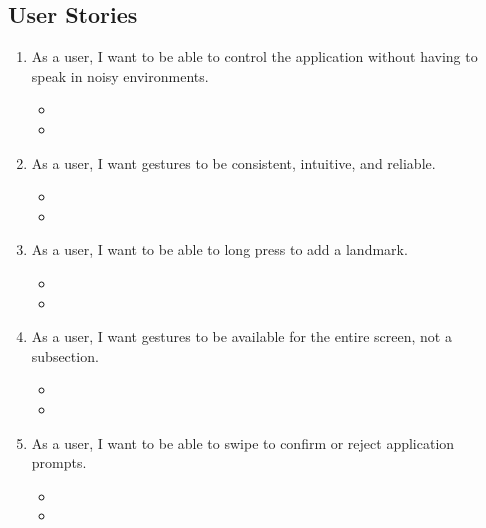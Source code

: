 \documentclass{scrreprt}
\begin{document}
\subsection{User Stories}
\begin{enumerate}
	\item As a user, I want to be able to control the application without having to speak in noisy environments.
	
		\begin{itemize}
			\item 
			\item 
		\end{itemize}
		
	\item As a user, I want gestures to be consistent, intuitive, and reliable.
	
		\begin{itemize}
			\item 
			\item 
		\end{itemize}
		
	\item As a user, I want to be able to long press to add a landmark.

		\begin{itemize}
			\item 
			\item 
		\end{itemize}
	
	\item As a user, I want gestures to be available for the entire screen, not a subsection.

		\begin{itemize}
			\item 
			\item 
		\end{itemize}
	
	\item As a user, I want to be able to swipe to confirm or reject application prompts.
	
		\begin{itemize}
			\item 
			\item 
		\end{itemize}
		
\end{enumerate}
\end{document}
